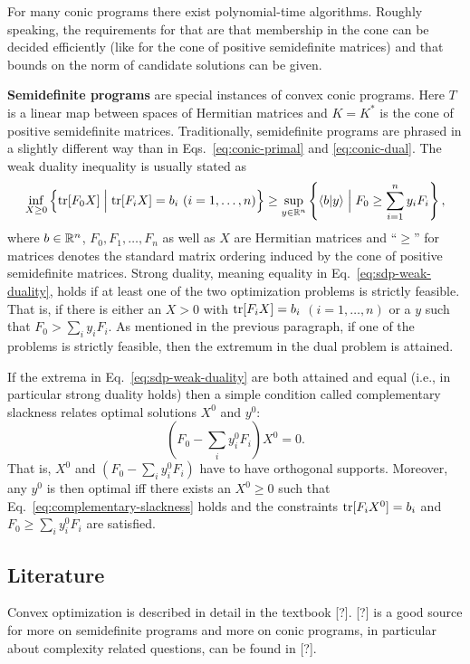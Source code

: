 \documentclass{article}
\numberwithin{equation}{section}
\begin{document}
For many conic programs there exist polynomial-time algorithms. Roughly
speaking, the requirements for that are that membership in the cone can be
decided efficiently (like for the cone of positive semidefinite matrices) and
that bounds on the norm of candidate solutions can be given.

\noindent\textbf{Semidefinite programs}
are special instances of convex conic programs. Here $T$ is a linear map
between spaces of Hermitian matrices and $K=K^{*}$ is the cone of positive
semidefinite matrices. Traditionally, semidefinite programs are phrased in a
slightly different way than in Eqs.~\eqref{eq:conic-primal} and
\eqref{eq:conic-dual}. The weak duality inequality is usually stated as
\begin{equation}\label{eq:sdp-weak-duality}
    \begin{aligned}
        \inf_{X\ge 0}\left\{\tr[F_0X] \Bigm| \tr[F_iX]=b_i \ (i=1,\dots,n)\right\}
        \ge
        \sup_{y\in \RR^{n}}\left\{\langle b|y\rangle \Bigm| F_0 \ge \sum_{i=1}^{n} y_i F_i\right\},
    \end{aligned}
\end{equation}
where $b\in \mathbb{R}^{n}$, $F_0,F_1,\ldots,F_n$ as well as $X$ are Hermitian matrices
and ``$\ge$'' for matrices denotes the standard matrix ordering induced by the
cone of positive semidefinite matrices. Strong duality, meaning equality in
Eq.~\eqref{eq:sdp-weak-duality}, holds if at least one of the two optimization
problems is strictly feasible. That is, if there is either an $X>0$ with
$\operatorname{tr}[F_iX]=b_i$ $(i=1,\dots,n)$ or a $y$ such that $F_0>\sum_i y_iF_i$. As
mentioned in the previous paragraph, if one of the problems is strictly
feasible, then the extremum in the dual problem is attained.

If the extrema in Eq.~\eqref{eq:sdp-weak-duality} are both attained and equal
(i.e., in particular strong duality holds) then a simple condition called
complementary slackness relates optimal solutions $X^0$ and $y^0$:
\begin{equation}\label{eq:complementary-slackness}
    \left(F_0 - \sum_i y_i^{0} F_i\right) X^{0} = 0.
\end{equation}
That is, $X^0$ and $(F_0-\sum_i y_i^{0}F_i)$ have to have orthogonal
supports. Moreover, any $y^0$ is then optimal iff there exists an $X^0\ge 0$
such that Eq.~\eqref{eq:complementary-slackness} holds and the constraints
$\operatorname{tr}[F_iX^0]=b_i$ and $F_0\ge \sum_i y_i^{0}F_i$ are satisfied.

\subsection{Literature}

Convex optimization is described in detail in the textbook [?]. [?] is a good
source for more on semidefinite programs and more on conic programs, in
particular about complexity related questions, can be found in [?].
\end{document}
